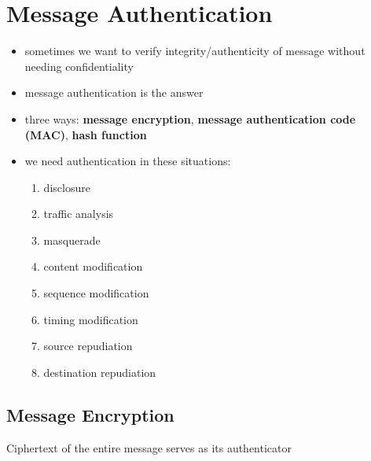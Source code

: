 \documentclass{article}
\begin{document}
\section{Message Authentication}
\begin{itemize}
    \item sometimes we want to verify integrity/authenticity of message without needing confidentiality
    \item message authentication is the answer
    \item three ways: \textbf{message encryption}, \textbf{message authentication code (MAC)}, \textbf{hash function}
    \item we need authentication in these situations:
    \begin{enumerate}
        \item disclosure
        \item traffic analysis
        \item masquerade
        \item content modification
        \item sequence modification
        \item timing modification
        \item source repudiation
        \item destination repudiation
    \end{enumerate}
\end{itemize}
\subsection{Message Encryption}
Ciphertext of the entire message serves as its authenticator
\end{document}
